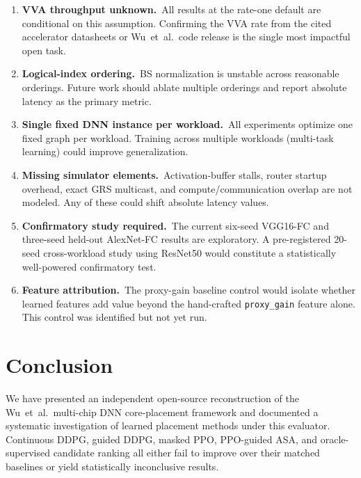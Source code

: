 \documentclass[10pt,conference]{IEEEtran}
\begin{document}
\begin{enumerate}
  \item \textbf{VVA throughput unknown.}\ All results at the rate-one default
        are conditional on this assumption.  Confirming the VVA rate from the
        cited accelerator datasheets or Wu~et~al.\ code release is the single
        most impactful open task.

  \item \textbf{Logical-index ordering.}\ BS normalization is unstable across
        reasonable orderings.  Future work should ablate multiple orderings and
        report absolute latency as the primary metric.

  \item \textbf{Single fixed DNN instance per workload.}\ All experiments
        optimize one fixed graph per workload.  Training across multiple
        workloads (multi-task learning) could improve generalization.

  \item \textbf{Missing simulator elements.}\ Activation-buffer stalls,
        router startup overhead, exact GRS multicast, and
        compute/communication overlap are not modeled.  Any of these could
        shift absolute latency values.

  \item \textbf{Confirmatory study required.}\ The current six-seed VGG16-FC
        and three-seed held-out AlexNet-FC results are exploratory.  A
        pre-registered 20-seed cross-workload study using ResNet50 would
        constitute a statistically well-powered confirmatory test.

  \item \textbf{Feature attribution.}\ The proxy-gain baseline control would
        isolate whether learned features add value beyond the hand-crafted
        \texttt{proxy\_gain} feature alone.  This control was identified but
        not yet run.
\end{enumerate}

\section{Conclusion}
\label{sec:conclusion}

We have presented an independent open-source reconstruction of the Wu~et~al.\
multi-chip DNN core-placement framework and documented a systematic investigation
of learned placement methods under this evaluator.  Continuous DDPG, guided
DDPG, masked PPO, PPO-guided ASA, and oracle-supervised candidate ranking all
either fail to improve over their matched baselines or yield statistically
inconclusive results.
\end{document}
